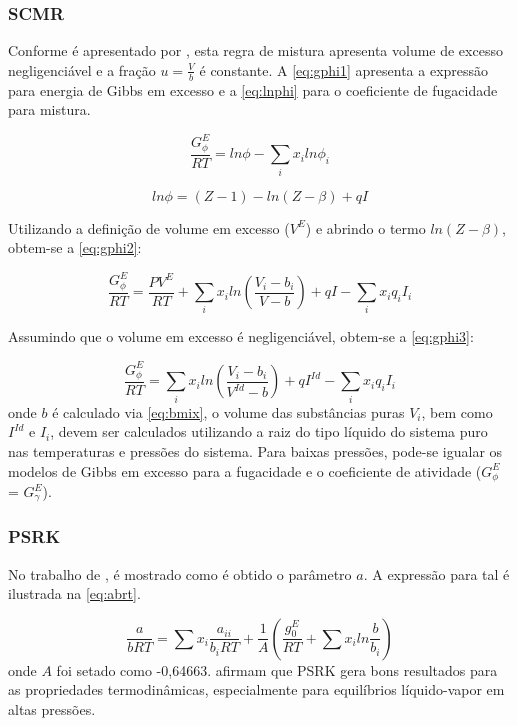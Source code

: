 \subsubsection{SCMR}
Conforme é apresentado por , esta regra de
mistura apresenta volume de excesso negligenciável e a fração $ u =
\frac{V}{b} $ é constante. A \autoref{eq:gphi1} apresenta a expressão para
energia de Gibbs em excesso e a \autoref{eq:lnphi} para o coeficiente de
fugacidade para mistura.

\begin{equation}\label{eq:gphi1}
\frac{G_\phi^E}{RT} = ln\phi - \sum_ix_iln\phi_i
\end{equation}

\begin{equation}\label{eq:lnphi}
ln\phi = (Z - 1) - ln(Z - \beta) + qI
\end{equation}

Utilizando a definição de volume em excesso ($V^E$) e abrindo o termo $ln(Z -
\beta)$, obtem-se a \autoref{eq:gphi2}:

\begin{equation}\label{eq:gphi2}
\frac{G_\phi^E}{RT} = \frac{PV^E}{RT} + \sum_ix_iln\left ( \frac{V_i - b_i}{V -
b} \right ) + qI - \sum_ix_iq_iI_i
\end{equation}

Assumindo que o volume em excesso é negligenciável, obtem-se a
\autoref{eq:gphi3}:

\begin{equation}\label{eq:gphi3}
\frac{G_\phi^E}{RT} = \sum_ix_iln\left ( \frac{V_i - b_i}{V^{Id} -
b} \right ) + qI^{Id} - \sum_ix_iq_iI_i
\end{equation}
onde $b$ é calculado via \autoref{eq:bmix}, o volume das substâncias puras
$V_i$, bem como $I^{Id}$ e $I_i$, devem ser calculados utilizando a raiz do tipo
líquido do sistema puro nas temperaturas e pressões do sistema. Para baixas pressões, pode-se igualar os
 modelos de Gibbs em excesso para a fugacidade e o coeficiente de atividade
 ($G_\phi^E$ = $G_\gamma^E$).

\subsubsection{PSRK}

No trabalho de , é mostrado como é obtido o parâmetro $a$.
A expressão para tal é ilustrada na \autoref{eq:abrt}.


\begin{equation}\label{eq:abrt}
\frac{a}{bRT} = \sum x_i\frac{a_{ii}}{b_iRT}+\frac{1}{A}\left (
\frac{g_0^E}{RT}+\sum x_iln\frac{b}{b_i} \right )
\end{equation}
onde $A$ foi setado como -0,64663.  afirmam
que PSRK gera bons resultados para as propriedades termodinâmicas, especialmente para 
equilíbrios líquido-vapor em altas pressões.

